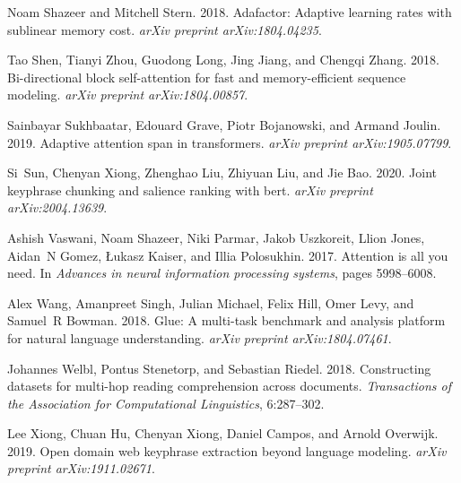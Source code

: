 \documentclass[11pt,a4paper]{article}
\begin{document}
\begin{thebibliography}{44}
Noam Shazeer and Mitchell Stern. 2018.
\newblock Adafactor: Adaptive learning rates with sublinear memory cost.
\newblock \emph{arXiv preprint arXiv:1804.04235}.

Tao Shen, Tianyi Zhou, Guodong Long, Jing Jiang, and Chengqi Zhang. 2018.
\newblock Bi-directional block self-attention for fast and memory-efficient
  sequence modeling.
\newblock \emph{arXiv preprint arXiv:1804.00857}.

Sainbayar Sukhbaatar, Edouard Grave, Piotr Bojanowski, and Armand Joulin. 2019.
\newblock Adaptive attention span in transformers.
\newblock \emph{arXiv preprint arXiv:1905.07799}.

Si~Sun, Chenyan Xiong, Zhenghao Liu, Zhiyuan Liu, and Jie Bao. 2020.
\newblock Joint keyphrase chunking and salience ranking with bert.
\newblock \emph{arXiv preprint arXiv:2004.13639}.

Ashish Vaswani, Noam Shazeer, Niki Parmar, Jakob Uszkoreit, Llion Jones,
  Aidan~N Gomez, {\L}ukasz Kaiser, and Illia Polosukhin. 2017.
\newblock Attention is all you need.
\newblock In \emph{Advances in neural information processing systems}, pages
  5998--6008.

Alex Wang, Amanpreet Singh, Julian Michael, Felix Hill, Omer Levy, and Samuel~R
  Bowman. 2018.
\newblock Glue: A multi-task benchmark and analysis platform for natural
  language understanding.
\newblock \emph{arXiv preprint arXiv:1804.07461}.

Johannes Welbl, Pontus Stenetorp, and Sebastian Riedel. 2018.
\newblock Constructing datasets for multi-hop reading comprehension across
  documents.
\newblock \emph{Transactions of the Association for Computational Linguistics},
  6:287--302.

Lee Xiong, Chuan Hu, Chenyan Xiong, Daniel Campos, and Arnold Overwijk. 2019.
\newblock Open domain web keyphrase extraction beyond language modeling.
\newblock \emph{arXiv preprint arXiv:1911.02671}.


\end{thebibliography}
\end{document}
